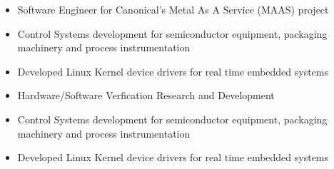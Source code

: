 \documentclass[10pt,a4paper,ragged2e,withhyper]{altacv}
\begin{document}
\begin{paracol}{2}


\begin{itemize}
\item Software Engineer for Canonical's Metal As A Service (MAAS) project
\end{itemize}

\divider

\begin{itemize}
\item Control Systems development for semiconductor equipment, packaging machinery and process instrumentation
\item Developed Linux Kernel device drivers for real time embedded systems
\end{itemize}

\divider

\begin{itemize}
  \item Hardware/Software Verfication Research and Development
\end{itemize}

\divider

\begin{itemize}
  \item Control Systems development for semiconductor equipment, packaging machinery and process instrumentation
  \item Developed Linux Kernel device drivers for real time embedded systems
\end{itemize}

\divider





\end{paracol}
\end{document}

